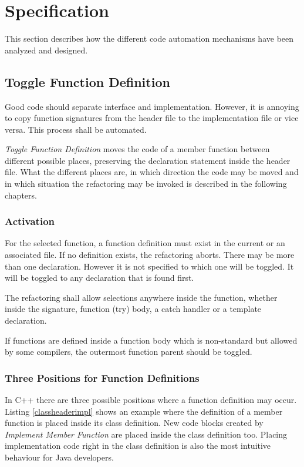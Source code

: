 \chapter{Specification}
\thispagestyle{fancy}

This section describes how the different code automation mechanisms have been
analyzed and designed.

\section{Toggle Function Definition}

Good code should separate interface and implementation. However, it is 
annoying to copy function signatures from the header file to the implementation 
file or vice versa. This process shall be automated.

\textit{Toggle Function Definition} moves the code of a member function between 
different possible places, preserving the declaration statement inside the 
header file. What the different places are, in which direction the code may be 
moved and in which situation the refactoring may be invoked is described in the 
following chapters.

\subsection{Activation}

For the selected function, a function definition must exist in the current or an
associated file. If no definition exists, the refactoring aborts. There may be
more than one declaration. However it is not specified to which one will be
toggled. It will be toggled to any declaration that is found first.

The refactoring shall allow selections anywhere inside the function, whether
inside the signature, function (try) body, a catch handler or a template 
declaration.

If functions are defined inside a function body which is non-standard but
allowed by some compilers, the outermost function parent should be toggled.
\cite{GCC}

\subsection{Three Positions for Function Definitions}

\label{positions}
In C++ there are three possible positions where a function definition may occur.
Listing \ref{classheaderimpl} shows an example where the definition of a member
function is placed inside its class definition. New code blocks created by
\textit{Implement Member Function} are placed inside the class definition too.
Placing implementation code right in the class definition is also the most
intuitive behaviour for Java developers.


